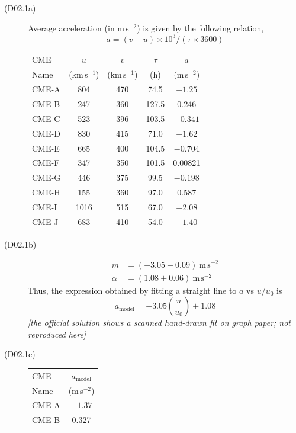 \begin{description}
\item[(D02.1a)] Average acceleration (in m\,s$^{-2}$) is given by the
  following relation,
  \[
  a = (v-u)\times 10^{3}/(\tau\times 3600)
  \]
  \begin{center}
  \begin{tabular}{l c c c c}
  \toprule
  CME & $u$ & $v$ & $\tau$ & $a$\\
  Name & (km\,s$^{-1}$) & (km\,s$^{-1}$) & (h) & (m\,s$^{-2}$)\\
  \midrule
  CME-A & 804  & 470 & 74.5  & $-1.25$\\
  CME-B & 247  & 360 & 127.5 & 0.246\\
  CME-C & 523  & 396 & 103.5 & $-0.341$\\
  CME-D & 830  & 415 & 71.0  & $-1.62$\\
  CME-E & 665  & 400 & 104.5 & $-0.704$\\
  CME-F & 347  & 350 & 101.5 & 0.00821\\
  CME-G & 446  & 375 & 99.5  & $-0.198$\\
  CME-H & 155  & 360 & 97.0  & 0.587\\
  CME-I & 1016 & 515 & 67.0  & $-2.08$\\
  CME-J & 683  & 410 & 54.0  & $-1.40$\\
  \bottomrule
  \end{tabular}
  \end{center}
\item[(D02.1b)]
  \begin{align*}
  m &= (-3.05 \pm 0.09)~\mathrm{m\,s^{-2}}\\
  \alpha &= (1.08 \pm 0.06)~\mathrm{m\,s^{-2}}
  \end{align*}
  Thus, the expression obtained by fitting a straight line to $a$ vs $u/u_0$
  is
  \[
  a_{\mathrm{model}} = -3.05\left(\frac{u}{u_0}\right) + 1.08
  \]
  \textit{[the official solution shows a scanned hand-drawn fit on graph
  paper; not reproduced here]}
\item[(D02.1c)]
  \begin{center}
  \begin{tabular}{l c}
  \toprule
  CME & $a_{\mathrm{model}}$\\
  Name & (m\,s$^{-2}$)\\
  \midrule
  CME-A & $-1.37$\\
  CME-B & 0.327\\

\end{tabular}
\end{center}
\end{description}
